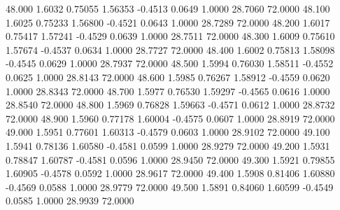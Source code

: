  48.000   1.6032   0.75055   1.56353  -0.4513   0.0649   1.0000  28.7060  72.0000
  48.100   1.6025   0.75233   1.56800  -0.4521   0.0643   1.0000  28.7289  72.0000
  48.200   1.6017   0.75417   1.57241  -0.4529   0.0639   1.0000  28.7511  72.0000
  48.300   1.6009   0.75610   1.57674  -0.4537   0.0634   1.0000  28.7727  72.0000
  48.400   1.6002   0.75813   1.58098  -0.4545   0.0629   1.0000  28.7937  72.0000
  48.500   1.5994   0.76030   1.58511  -0.4552   0.0625   1.0000  28.8143  72.0000
  48.600   1.5985   0.76267   1.58912  -0.4559   0.0620   1.0000  28.8343  72.0000
  48.700   1.5977   0.76530   1.59297  -0.4565   0.0616   1.0000  28.8540  72.0000
  48.800   1.5969   0.76828   1.59663  -0.4571   0.0612   1.0000  28.8732  72.0000
  48.900   1.5960   0.77178   1.60004  -0.4575   0.0607   1.0000  28.8919  72.0000
  49.000   1.5951   0.77601   1.60313  -0.4579   0.0603   1.0000  28.9102  72.0000
  49.100   1.5941   0.78136   1.60580  -0.4581   0.0599   1.0000  28.9279  72.0000
  49.200   1.5931   0.78847   1.60787  -0.4581   0.0596   1.0000  28.9450  72.0000
  49.300   1.5921   0.79855   1.60905  -0.4578   0.0592   1.0000  28.9617  72.0000
  49.400   1.5908   0.81406   1.60880  -0.4569   0.0588   1.0000  28.9779  72.0000
  49.500   1.5891   0.84060   1.60599  -0.4549   0.0585   1.0000  28.9939  72.0000
